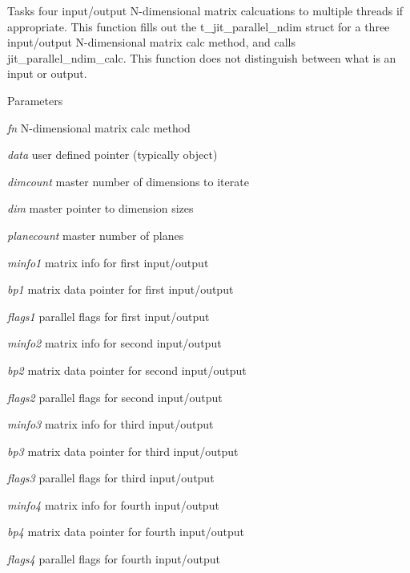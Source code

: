 Tasks four input/output N-\/dimensional matrix calcuations to multiple threads if appropriate. This function fills out the t\_\-jit\_\-parallel\_\-ndim struct for a three input/output N-\/dimensional matrix calc method, and calls jit\_\-parallel\_\-ndim\_\-calc. This function does not distinguish between what is an input or output.


\begin{DoxyParams}{Parameters}
\item[{\em fn}]N-\/dimensional matrix calc method \item[{\em data}]user defined pointer (typically object) \item[{\em dimcount}]master number of dimensions to iterate \item[{\em dim}]master pointer to dimension sizes \item[{\em planecount}]master number of planes \item[{\em minfo1}]matrix info for first input/output \item[{\em bp1}]matrix data pointer for first input/output \item[{\em flags1}]parallel flags for first input/output \item[{\em minfo2}]matrix info for second input/output \item[{\em bp2}]matrix data pointer for second input/output \item[{\em flags2}]parallel flags for second input/output \item[{\em minfo3}]matrix info for third input/output \item[{\em bp3}]matrix data pointer for third input/output \item[{\em flags3}]parallel flags for third input/output \item[{\em minfo4}]matrix info for fourth input/output \item[{\em bp4}]matrix data pointer for fourth input/output \item[{\em flags4}]parallel flags for fourth input/output \end{DoxyParams}
